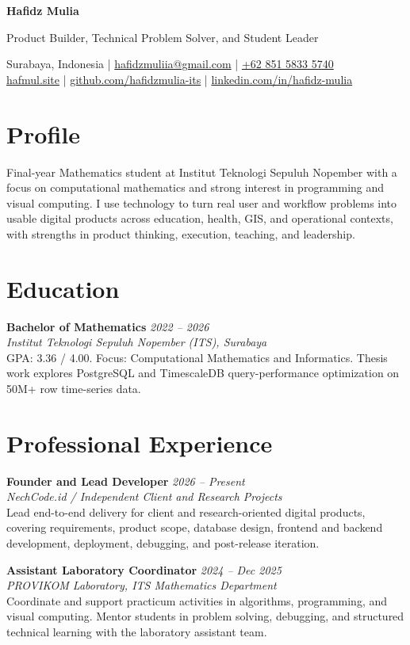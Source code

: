 \documentclass[a4paper,10pt]{article}
\newcommand{\cvname}[1]{{\centering\LARGE\bfseries #1\par\vspace{2pt}}}
\newcommand{\cvtitle}[1]{{\centering\large\color{accent} #1\par\vspace{4pt}}}
\newcommand{\cvcontact}[1]{{\centering\small #1\par\vspace{5pt}}}
\newcommand{\entry}[4]{%
  \textbf{#1} \hfill \textit{#3}\\
  \textit{#2}\\
  {\small #4}\vspace{4pt}
}
\begin{document}
\color{textgray}

\cvname{Hafidz Mulia}
\cvtitle{Product Builder, Technical Problem Solver, and Student Leader}
\cvcontact{%
  Surabaya, Indonesia \quad | \quad
  \href{mailto:hafidzmuliia@gmail.com}{hafidzmuliia@gmail.com} \quad | \quad
  \href{tel:+6285158335740}{+62 851 5833 5740}\\
  \href{https://hafmul.site}{hafmul.site} \quad | \quad
  \href{https://github.com/hafidzmulia-its}{github.com/hafidzmulia-its} \quad | \quad
  \href{https://www.linkedin.com/in/hafidz-mulia/}{linkedin.com/in/hafidz-mulia}
}

\section{Profile}
Final-year Mathematics student at Institut Teknologi Sepuluh Nopember with a focus on computational mathematics and strong interest in programming and visual computing. I use technology to turn real user and workflow problems into usable digital products across education, health, GIS, and operational contexts, with strengths in product thinking, execution, teaching, and leadership.

\section{Education}
\entry
  {Bachelor of Mathematics}
  {Institut Teknologi Sepuluh Nopember (ITS), Surabaya}
  {2022 -- 2026}
  {GPA: 3.36 / 4.00. Focus: Computational Mathematics and Informatics. Thesis work explores PostgreSQL and TimescaleDB query-performance optimization on 50M+ row time-series data.}

\section{Professional Experience}
\entry
  {Founder and Lead Developer}
  {NechCode.id / Independent Client and Research Projects}
  {2026 -- Present}
  {Lead end-to-end delivery for client and research-oriented digital products, covering requirements, product scope, database design, frontend and backend development, deployment, debugging, and post-release iteration.}

\entry
  {Assistant Laboratory Coordinator}
  {PROVIKOM Laboratory, ITS Mathematics Department}
  {2024 -- Dec 2025}
  {Coordinate and support practicum activities in algorithms, programming, and visual computing. Mentor students in problem solving, debugging, and structured technical learning with the laboratory assistant team.}
\end{document}
